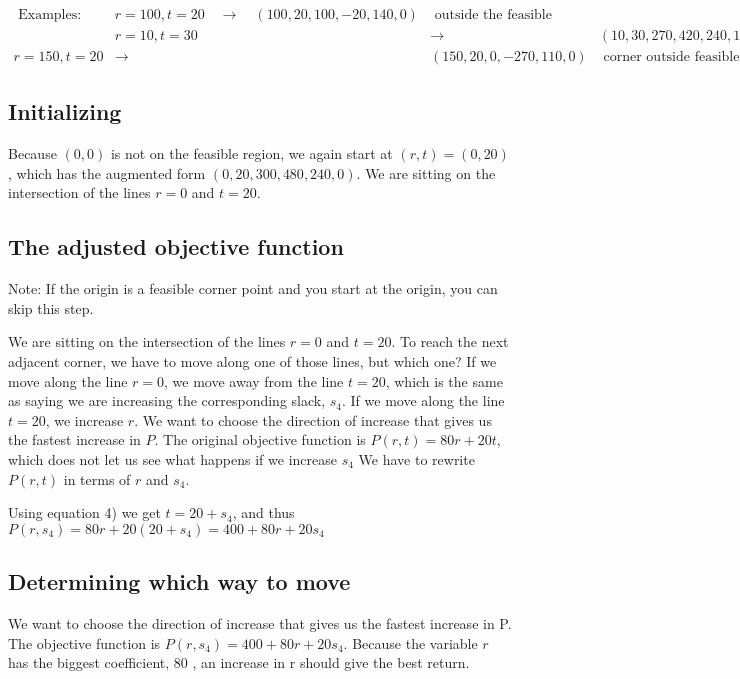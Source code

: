 $\begin{array}{lllll}\text { Examples: } & r=100, t=20 \quad \rightarrow \quad(100,20,100,-20,140,0) & \text { outside the feasible region } \\ & r=10, t=30 \quad & \rightarrow & (10,30,270,420,240,10) & \text { inside feasible region } \\ r=150, t=20 & \rightarrow & (150,20,0,-270,110,0) & \text { corner outside feasible region }\end{array}$

\subsection{Initializing}
Because $(0,0)$ is not on the feasible region, we again start at $(r, t)=(0,20)$, which has the augmented form $(0,20,300,480,240,0)$. We are sitting on the intersection of the lines $r=0$ and $t=20$.

\subsection{The adjusted objective function}
Note: If the origin is a feasible corner point and you start at the origin, you can skip this step.

We are sitting on the intersection of the lines $r=0$ and $t=20$. To reach the next adjacent corner, we have to move along one of those lines, but which one? If we move along the line $r=0$, we move away from the line $t=20$, which is the same as saying we are increasing the corresponding slack, $s_{4}$. If we move along the line $t=20$, we increase $r$. We want to choose the direction of increase that gives us the fastest increase in $P$. The original objective function is $P(r, t)=80 r+20 t$, which does not let us see what happens if we increase $s_{4}$ We have to rewrite $P(r, t)$ in terms of $r$ and $s_{4}$.

Using equation 4) we get $t=20+s_{4}$, and thus $P\left(r, s_{4}\right)=80 r+20\left(20+s_{4}\right)=400+80 r+20 s_{4}$

\subsection{Determining which way to move}
We want to choose the direction of increase that gives us the fastest increase in P. The objective function is $P\left(r, s_{4}\right)=400+80 r+20 s_{4}$. Because the variable $r$ has the biggest coefficient, 80 , an increase in r should give the best return.

